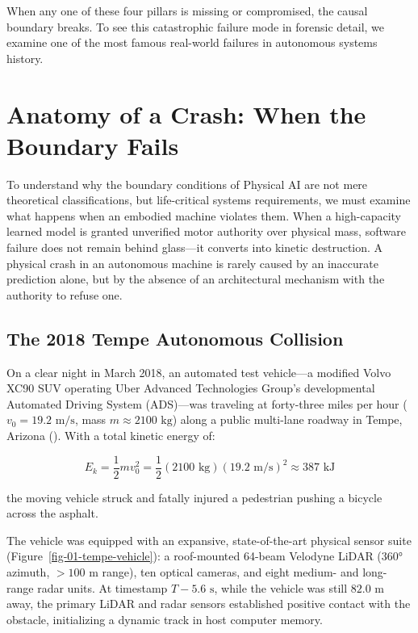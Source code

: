 \documentclass[
  10pt,
  letterpaper,
  twoside,
  openright,
  numbers=noenddot,
  headings=standardclasses
]{scrbook}
\begin{document}
When any one of these four pillars is missing or compromised, the causal
boundary breaks. To see this catastrophic failure mode in forensic
detail, we examine one of the most famous real-world failures in
autonomous systems history.

\section{Anatomy of a Crash: When the Boundary
Fails}\label{sec-boundary-1-6}

To understand why the boundary conditions of Physical AI are not mere
theoretical classifications, but life-critical systems requirements, we
must examine what happens when an embodied machine violates them. When a
high-capacity learned model is granted unverified motor authority over
physical mass, software failure does not remain behind glass---it
converts into kinetic destruction. A physical crash in an autonomous
machine is rarely caused by an inaccurate prediction alone, but by the
absence of an architectural mechanism with the authority to refuse one.

\subsection{The 2018 Tempe Autonomous
Collision}\label{the-2018-tempe-autonomous-collision}

On a clear night in March 2018, an automated test vehicle---a modified
Volvo XC90 SUV operating Uber Advanced Technologies Group's
developmental Automated Driving System (ADS)---was traveling at
forty-three miles per hour (\(v_0 = 19.2\text{ m/s}\), mass
\(m \approx 2100\text{ kg}\)) along a public multi-lane roadway in
Tempe, Arizona (). With a total kinetic
energy of:

\[E_k = \frac{1}{2} m v_0^2 = \frac{1}{2}(2100\text{ kg})(19.2\text{ m/s})^2 \approx 387\text{ kJ}\]

the moving vehicle struck and fatally injured a pedestrian pushing a
bicycle across the asphalt.

The vehicle was equipped with an expansive, state-of-the-art physical
sensor suite (Figure~\ref{fig-01-tempe-vehicle}): a roof-mounted 64-beam
Velodyne LiDAR (360° azimuth, \(> 100\text{ m}\) range), ten optical
cameras, and eight medium- and long-range radar units. At timestamp
\(T - 5.6\text{ s}\), while the vehicle was still \(82.0\text{ m}\)
away, the primary LiDAR and radar sensors established positive contact
with the obstacle, initializing a dynamic track in host computer memory.
\end{document}
